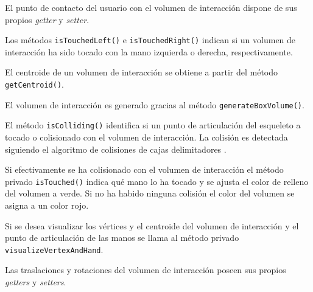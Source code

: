 \documentclass[10pt,a4paper]{report}
\begin{document}
	El punto de contacto del usuario con el volumen de interacción dispone de sus propios \textit{getter} y \textit{setter}.
	
	
	
	Los métodos \texttt{isTouchedLeft()} e \texttt{isTouchedRight()} indican si un volumen de interacción ha sido tocado con la mano izquierda o derecha, respectivamente.
	
	
	
	El centroide de un volumen de interacción se obtiene a partir del método \texttt{getCentroid()}.
	
	
	
	El volumen de interacción es generado gracias al método \texttt{generateBoxVolume()}.
	
	
	
	El método \texttt{isColliding()} identifica si un punto de articulación del esqueleto a tocado o colisionado con el volumen de interacción. La colisión es detectada siguiendo el algoritmo de colisiones de cajas delimitadores \cite{3d-collision-detection}.
	
	
	
	Si efectivamente se ha colisionado con el volumen de interacción el método privado \texttt{isTouched()} indica qué mano lo ha tocado y se ajusta el color de relleno del volumen a verde. Si no ha habido ninguna colisión el color del volumen se asigna a un color rojo.
	
	
	
	Si se desea visualizar los vértices y el centroide del volumen de interacción y el punto de articulación de las manos se llama al método privado \texttt{visualizeVertexAndHand}.
	
	
	
	Las traslaciones y rotaciones del volumen de interacción poseen sus propios \textit{getters} y \textit{setters}.
	
\end{document}
